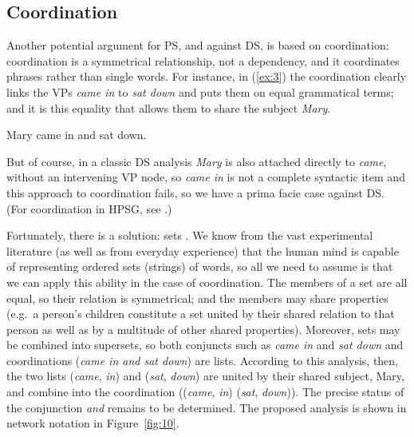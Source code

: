 \documentclass[output=paper,biblatex,babelshorthands,newtxmath,draftmode,colorlinks,citecolor=brown]{langscibook}
\begin{document}
\subsection{Coordination}
\label{sec:4.2}

Another potential argument for PS, and against DS, is based on coordination: coordination is a
symmetrical relationship, not a dependency, and it coordinates phrases rather than single words. For
instance, in (\ref{ex:3}) the coordination clearly links the VPs \emph{came in} to \emph{sat down}
and puts them on equal grammatical terms; and it is this equality that allows them to share the
subject \emph{Mary}.

\begin{exe}
	\ex \label{ex:3} Mary came in and sat down.
\end{exe}
%
But of course, in a classic DS analysis \emph{Mary} is also attached directly to \emph{came},
without an intervening VP node, so \emph{came in} is not a complete syntactic item and this approach
to coordination fails, so we have a prima facie case against DS. (For coordination in HPSG, see
.)

Fortunately, there is a solution: sets \citep[404--421]{Hudson90a-u}. We know from the vast
experimental literature (as well as from everyday experience) that the human mind is capable of
representing ordered sets (strings) of words, so all we need to assume is that we can apply this
ability in the case of coordination. The members of a set are all equal, so their relation is
symmetrical; and the members may share properties (e.g.\ a person's children constitute a set united
by their shared relation to that person as well as by a multitude of other shared
properties). Moreover, sets may be combined into supersets, so both conjuncts such as \emph{came in}
and \emph{sat down} and coordinations (\emph{came in and sat down}) are lists. According to
this analysis, then, the two lists (\emph{came}, \emph{in}) and (\emph{sat}, \emph{down}) are united
by their shared subject, Mary, and combine into the coordination ((\emph{came}, \emph{in})
(\emph{sat}, \emph{down})). The precise status of the conjunction \emph{and} remains to be
determined. The proposed analysis is shown in network notation in Figure~\ref{fig:10}.
\end{document}
